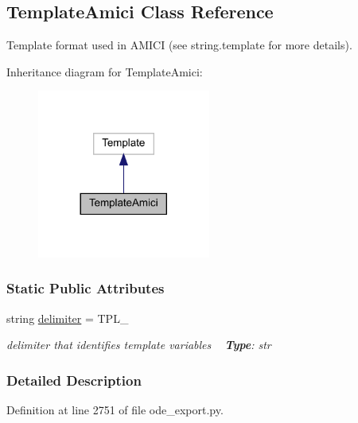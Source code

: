 \hypertarget{classamici_1_1ode__export_1_1_template_amici}{}\subsection{Template\+Amici Class Reference}
\label{classamici_1_1ode__export_1_1_template_amici}


Template format used in A\+M\+I\+CI (see string.\+template for more details).  




Inheritance diagram for Template\+Amici\+:
\nopagebreak
\begin{figure}[H]
\begin{center}
\leavevmode
\includegraphics[width=161pt]{classamici_1_1ode__export_1_1_template_amici__inherit__graph}
\end{center}
\end{figure}
\subsubsection*{Static Public Attributes}
\begin{DoxyCompactItemize}
\item 
\mbox{\label{classamici_1_1ode__export_1_1_template_amici_aacf4e58be14eef37272a71c004bc3f58}} 
string \mbox{\hyperlink{classamici_1_1ode__export_1_1_template_amici_aacf4e58be14eef37272a71c004bc3f58}{delimiter}} = \textquotesingle{}T\+P\+L\+\_\+\textquotesingle{}
\begin{DoxyCompactList}\small\item\em delimiter that identifies template variables ~\newline
{\bfseries{Type}}\+: str \end{DoxyCompactList}\end{DoxyCompactItemize}


\subsubsection{Detailed Description}


Definition at line 2751 of file ode\+\_\+export.\+py.

